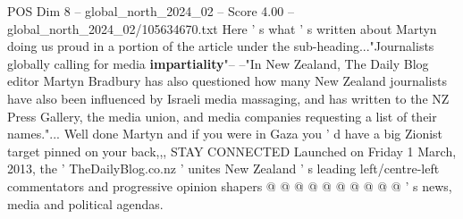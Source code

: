 \begin{textsample}{POS Dim 8 – global\_north\_2024\_02 – Score 4.00 – global\_north\_2024\_02/105634670.txt}
Here ' s what ' s written about Martyn doing us proud in a portion of the article under the sub-heading..."Journalists globally calling for media \textbf{impartiality}"-- --"In New Zealand, The Daily Blog editor Martyn Bradbury has also questioned how many New Zealand journalists have also been influenced by Israeli media massaging, and has written to the NZ Press Gallery, the media union, and media companies requesting a list of their names."...
Well done Martyn and if you were in Gaza you ' d have a big Zionist target pinned on your back,,, STAY CONNECTED Launched on Friday 1 March, 2013, the ' TheDailyBlog.co.nz ' unites New Zealand ' s leading left/centre-left commentators and progressive opinion shapers @ @ @ @ @ @ @ @ @ @ ' s news, media and political agendas.

\end{textsample}
